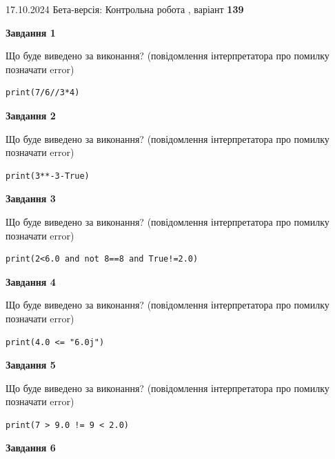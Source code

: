 \documentclass[12pt, ukrainian]{article}
\begin{document}
{\Large{17.10.2024 Бета-версія: Контрольна робота , варіант  \No \textbf { 139 }\par}}
{
\begin {large}
{\begin {center}\textbf{Завдання 1}\end {center}}

Що буде виведено за виконання? (повідомлення інтерпретатора про помилку позначати error)\par
\begin{verbatim}
print(7/6//3*4)
\end{verbatim}

{\begin {center}\textbf{Завдання 2}\end {center}}

Що буде виведено за виконання? (повідомлення інтерпретатора про помилку позначати error)\par
\begin{verbatim}
print(3**-3-True)
\end{verbatim}

{\begin {center}\textbf{Завдання 3}\end {center}}

Що буде виведено за виконання? (повідомлення інтерпретатора про помилку позначати error)\par
\begin{verbatim}
print(2<6.0 and not 8==8 and True!=2.0)
\end{verbatim}

{\begin {center}\textbf{Завдання 4}\end {center}}

Що буде виведено за виконання? (повідомлення інтерпретатора про помилку позначати error)\par
\begin{verbatim}
print(4.0 <= "6.0j")
\end{verbatim}

{\begin {center}\textbf{Завдання 5}\end {center}}

Що буде виведено за виконання? (повідомлення інтерпретатора про помилку позначати error)\par
\begin{verbatim}
print(7 > 9.0 != 9 < 2.0)
\end{verbatim}

{\begin {center}\textbf{Завдання 6}\end {center}}


\end{large}}
\end{document}
